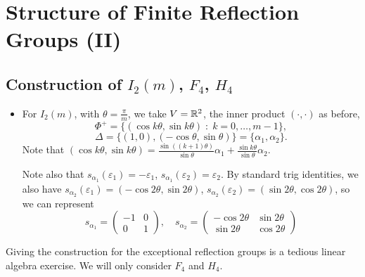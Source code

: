 \section{Structure of Finite Reflection Groups (II)}

\subsection{Construction of $I_2(m)$, $F_4$, $H_4$}

\begin{itemize}
\item
For $I_2(m)$, with $\theta = \frac{\pi}{m}$, we take $V = \mathbb{R}^2$, the inner
product $(\cdot, \cdot)$ as before,
\[ \Phi^+ = \{(\cos k\theta, \sin
k\theta) \; : \; k=0,\dots,m-1\}, \]
\[ \Delta = \{(1,0), (-\cos \theta, \sin \theta)\} = \{\alpha_1, \alpha_2\}. \]
Note that $(\cos k\theta, \sin k\theta) = \frac{\sin((k+1)\theta)}{\sin \theta}
\alpha_1 + \frac{\sin k\theta}{\sin \theta} \alpha_2$.

Note also that $s_{\alpha_1}(\varepsilon_1) = -\varepsilon_1$,
$s_{\alpha_1}(\varepsilon_2) = \varepsilon_2$. By standard trig
identities, we also have
$s_{\alpha_2}(\varepsilon_1) = (-\cos 2\theta, \sin 2\theta)$,
$s_{\alpha_2}(\varepsilon_2) = (\sin 2\theta, \cos 2\theta)$, so we can
represent
\[
    s_{\alpha_1} = \begin{pmatrix} -1 & 0 \\ 0 & 1 \end{pmatrix}, \quad
    s_{\alpha_2} = \begin{pmatrix} -\cos 2\theta & \sin 2\theta \\
        \sin 2\theta & \cos 2\theta \end{pmatrix}
\]
\end{itemize}

Giving the construction for the exceptional reflection groups is a tedious
linear algebra exercise. We will only consider $F_4$ and $H_4$.

